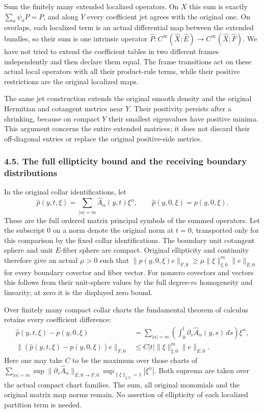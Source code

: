 \documentclass[
  11pt,
]{article}
\begin{document}
Sum the finitely many extended localized operators. On \(X\) this sum is
exactly \(\sum_a\psi_aP=P\), and along \(Y\) every coefficient jet
agrees with the original one. On overlaps, each localized term is an
actual differential map between the extended bundles, so their sum is
one intrinsic operator
\(\widehat P:C^\infty(\widehat X;\widehat E)\to C^\infty(\widehat X;\widehat F)\).
We have not tried to extend the coefficient tables in two different
frames independently and then declare them equal. The frame transitions
act on these actual local operators with all their product-rule terms,
while their positive restrictions are the original localized maps.

The same jet construction extends the original smooth density and the
original Hermitian and cotangent metrics near \(Y\). Their positivity
persists after a shrinking, because on compact \(Y\) their smallest
eigenvalues have positive minima. This argument concerns the entire
extended matrices; it does not discard their off-diagonal entries or
replace the original positive-side metrics.

\subsubsection{4.5. The full ellipticity bound and the receiving
boundary
distributions}\label{the-full-ellipticity-bound-and-the-receiving-boundary-distributions}

In the original collar identifications, let \[
 \widehat p(y,t,\xi)
       =\sum_{|\alpha|=m}\widehat A_\alpha(y,t)\xi^\alpha,
       \qquad \widehat p(y,0,\xi)=p(y,0,\xi).
 \tag{CJ15}
\] These are the full ordered matrix principal symbols of the summed
operators. Let the subscript \(0\) on a norm denote the original norm at
\(t=0\), transported only for this comparison by the fixed collar
identifications. The boundary unit cotangent sphere and unit \(E\)-fiber
sphere are compact. Original ellipticity and continuity therefore give
an actual \(\mu>0\) such that
\(\|p(y,0,\xi)e\|_{F,0}\geq\mu\|\xi\|_{\xi,0}^m\|e\|_{E,0}\) for every
boundary covector and fiber vector. For nonzero covectors and vectors
this follows from their unit-sphere values by the full degree-\(m\)
homogeneity and linearity; at zero it is the displayed zero bound.

Over finitely many compact collar charts the fundamental theorem of
calculus retains every coefficient difference: \[
\begin{split}
 \widehat p(y,t,\xi)-p(y,0,\xi)
 &=\sum_{|\alpha|=m}
      \left(\int_0^t\partial_s\widehat A_\alpha(y,s)\,ds\right)
                 \xi^\alpha,\\
 \|(\widehat p(y,t,\xi)-p(y,0,\xi))e\|_{F,0}
 &\leq C|t|\|\xi\|_{\xi,0}^m\|e\|_{E,0}.
\end{split}
\tag{CJ16}
\] Here one may take \(C\) to be the maximum over those charts of
\(\sum_{|\alpha|=m}
 \sup\|\partial_s\widehat A_\alpha\|_{E,0\to F,0}
 \sup_{\|\xi\|_{\xi,0}=1}|\xi^\alpha|\). Both suprema are taken over the
actual compact chart families. The sum, all original monomials and the
original matrix map norms remain. No assertion of ellipticity of each
localized partition term is needed.
\end{document}
